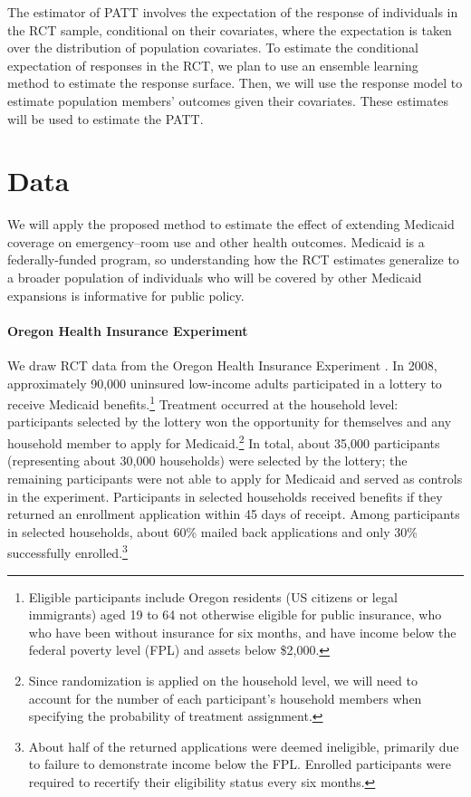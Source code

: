 \documentclass{article}
\begin{document}
The estimator of PATT involves the expectation of the response of individuals in the RCT sample, conditional on their covariates, where the expectation is taken over the distribution of population covariates.  To estimate the conditional expectation of responses in the RCT, we plan to use an ensemble learning method to estimate the response surface.  Then, we will use the response model to estimate population members' outcomes given their covariates.  These estimates will be used to estimate the PATT.

\section{Data}

We will apply the proposed method to estimate the effect of extending Medicaid coverage on emergency--room use and other health outcomes.  Medicaid is a federally-funded program, so understanding how the RCT estimates generalize to a broader population of individuals who will be covered by other Medicaid expansions is informative for public policy. 

\paragraph{Oregon Health Insurance Experiment}

We draw RCT data from the Oregon Health Insurance Experiment \cite{finkelstein2012,Taubman}.  In 2008, approximately 90,000 uninsured low-income adults participated in a lottery to receive Medicaid benefits.\footnote{Eligible participants include Oregon residents (US citizens or legal immigrants) aged 19 to 64 not otherwise eligible for public insurance, who who have been without insurance for six months, and have income below the federal poverty level (FPL) and assets below \$2,000.} Treatment occurred at the household level: participants selected by the lottery won the opportunity for themselves and any household member to apply for Medicaid.\footnote{Since randomization is applied on the household level, we will need to account for the number of each participant's household members when specifying the probability of treatment assignment.} In total, about 35,000 participants (representing about 30,000 households) were selected by the lottery; the remaining participants were not able to apply for Medicaid and served as controls in the experiment.  Participants in selected households received benefits if they returned an enrollment application within 45 days of receipt. Among participants in selected households, about 60\% mailed back applications and only 30\% successfully enrolled.\footnote{About half of the returned applications were deemed ineligible, primarily due to failure to demonstrate income below the FPL. Enrolled participants were required to recertify their eligibility status every six months.} \\
\end{document}
